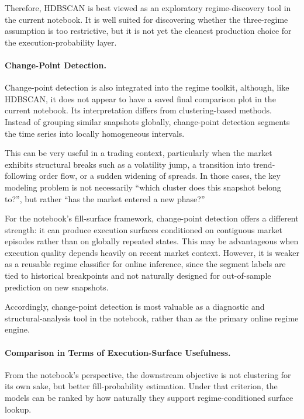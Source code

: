 \documentclass[12pt,a4paper]{report}
\begin{document}
Therefore, HDBSCAN is best viewed as an exploratory regime-discovery tool in the current notebook. It is well suited for discovering whether the three-regime assumption is too restrictive, but it is not yet the cleanest production choice for the execution-probability layer.

\paragraph{Change-Point Detection.}
Change-point detection is also integrated into the regime toolkit, although, like HDBSCAN, it does not appear to have a saved final comparison plot in the current notebook. Its interpretation differs from clustering-based methods. Instead of grouping similar snapshots globally, change-point detection segments the time series into locally homogeneous intervals.

This can be very useful in a trading context, particularly when the market exhibits structural breaks such as a volatility jump, a transition into trend-following order flow, or a sudden widening of spreads. In those cases, the key modeling problem is not necessarily ``which cluster does this snapshot belong to?'', but rather ``has the market entered a new phase?''

For the notebook's fill-surface framework, change-point detection offers a different strength: it can produce execution surfaces conditioned on contiguous market episodes rather than on globally repeated states. This may be advantageous when execution quality depends heavily on recent market context. However, it is weaker as a reusable regime classifier for online inference, since the segment labels are tied to historical breakpoints and not naturally designed for out-of-sample prediction on new snapshots.

Accordingly, change-point detection is most valuable as a diagnostic and structural-analysis tool in the notebook, rather than as the primary online regime engine.

\paragraph{Comparison in Terms of Execution-Surface Usefulness.}
From the notebook's perspective, the downstream objective is not clustering for its own sake, but better fill-probability estimation. Under that criterion, the models can be ranked by how naturally they support regime-conditioned surface lookup.
\end{document}
